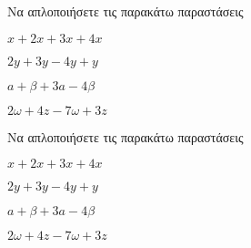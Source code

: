 Να απλοποιήσετε τις παρακάτω παραστάσεις
\begin{alist}
\item $ x+2x+3x+4x $
\item $ 2y+3y-4y+y $
\item $ a+\beta+3a-4\beta $
\item $ 2\omega+4z-7\omega+3z $
\end{alist}
Να απλοποιήσετε τις παρακάτω παραστάσεις
\begin{alist}
\item $ x+2x+3x+4x $
\item $ 2y+3y-4y+y $
\item $ a+\beta+3a-4\beta $
\item $ 2\omega+4z-7\omega+3z $
\end{alist}
